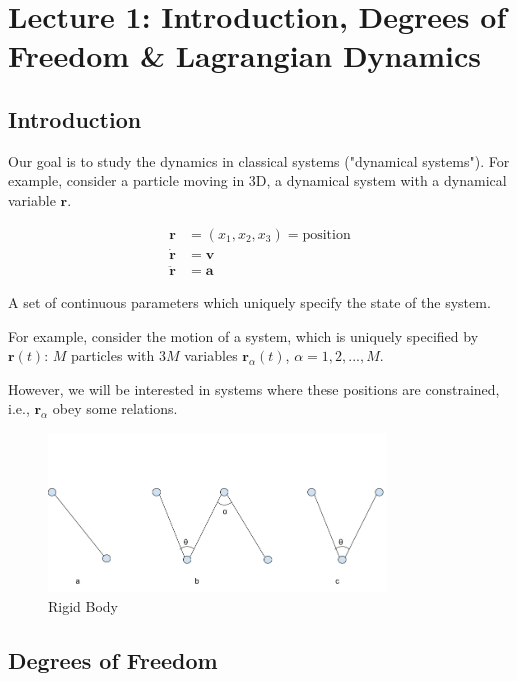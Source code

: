 \setcounter{section}{0}
\section{Lecture 1: Introduction, Degrees of Freedom \& Lagrangian Dynamics}

\subsection{Introduction}

Our goal is to study the dynamics in classical systems ("dynamical systems"). For example, consider a particle moving in 3D, a dynamical system with a dynamical variable $\mathbf{r}$.

\begin{align*}
    \mathbf{r} &= (x_1, x_2, x_3) = \text{position} \\
    \dot{\mathbf{r}} &= \mathbf{v} \\
    \ddot{\mathbf{r}} &= \mathbf{a} 
\end{align*}

\begin{definition}
    A set of continuous parameters which uniquely specify the state of the system.
\end{definition}

For example, consider the motion of a system, which is uniquely specified by $\mathbf{r}(t)$: $M$ particles with $3M$ variables $\mathbf{r}_\alpha(t)$, $\alpha=1,2,...,M$.

However, we will be interested in systems where these positions are constrained, i.e., $\mathbf{r}_\alpha$ obey some relations.

\begin{figure}[h]
  \centering
  \includegraphics[width=0.8\textwidth]{images/1-1-1.png}
  \caption{Rigid Body}
  \label{fig:1-1-1}
\end{figure}

\subsection{Degrees of Freedom}

